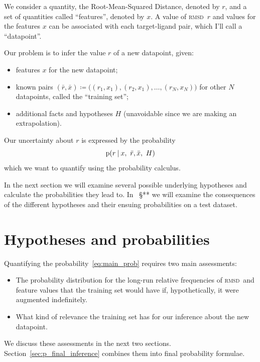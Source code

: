 \documentclass[\ifafour a4paper,12pt,\else a5paper,10pt,\fi%
onecolumn,oneside,article,%
british%
]{memoir}
\theoremstyle{remark}
\theoremstyle{innote}
\newcommand*{\defd}{\coloneqq}
\newcommand*{\p}{\mathrm{p}}%
\renewcommand*{\|}[1][]{\nonscript\:#1\vert\nonscript\:\mathopen{}}
\renewcommand*{\=}{\TextOrMath\texteq\eq}
\newcommand*{\sect}{\S}%
\newcommand*{\wrench}{{\fontencoding{U}\fontfamily{fontawesomethree}\selectfont\symbol{114}}}
\newcommand{\mynote}[1]{ {\color{notecolour}#1}}
\newcommand*{\rmsd}{\textsc{rmsd}}
\newcommand*{\ro}{r}
\newcommand*{\xo}{x}
\newcommand*{\rd}{\bar{r}}
\newcommand*{\xd}{\bar{x}}
\begin{document}
We consider a quantity, the Root-Mean-Squared Distance, denoted by $r$, and
a set of quantities called \enquote{features}, denoted by $x$. A
value of \rmsd\ $r$
and values for the  features $x$ can be associated with each target-ligand
pair, which I'll call a \enquote{datapoint}.

Our problem is to infer the value $\ro$ of a new datapoint, given:
\begin{itemize}
\item features $\xo$ for the new datapoint;
\item known pairs
  $(\rd,\xd) \defd \bigl((r_{1}, x_{1}), (r_{2}, x_{1}), \dotsc, (r_{N},
  x_{N})\bigr)$ for other $N$ datapoints, called the \enquote{training
    set};
\item additional facts and hypotheses $H$ (unavoidable since we are making an
extrapolation).
\end{itemize}

Our uncertainty about $\ro$ is expressed by the probability
\begin{equation}
  \label{eq:main_prob}
  \p(\ro \| \xo,\ \rd,\xd,\ H) 
\end{equation}
which we want to quantify using the probability calculus.

In the next section we will examine several possible underlying hypotheses
and calculate the probabilities they lead to. In \mynote{\wrench\ \sect***}
we will examine the consequences of the different hypotheses and their
ensuing probabilities on a test dataset.


\section{Hypotheses and probabilities}
\label{sec:hypotheses}

Quantifying the probability~\eqref{eq:main_prob} requires two main
assessments:
\begin{itemize}
\item The probability distribution for the long-run relative frequencies of
  \rmsd\ and feature values that the training set would have if,
  hypothetically, it were augmented indefinitely.
\item What kind of relevance the training set has for our inference about
  the new datapoint.
\end{itemize}
We discuss these assessments in the next two sections.
Section~\ref{sec:p_final_inference} combines them into final probability
formulae.
\end{document}
